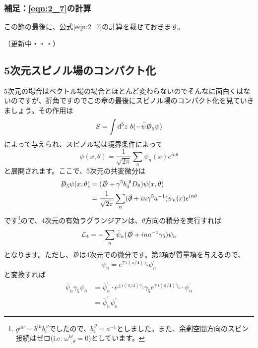 \documentclass[unicode,a4paper,11pt]{ltjsarticle}
\begin{document}
\subsubsection*{補足：\texorpdfstring{\eqref{eqn:2_7}}{公式}の計算}

この節の最後に、公式\eqref{eqn:2_7}の計算を載せておきます。

（更新中・・・）










\subsection{5次元スピノル場のコンパクト化}

5次元の場合はベクトル場の場合とほとんど変わらないのでそんなに面白くはないのですが、折角ですのでこの章の最後にスピノル場のコンパクト化を見ていきましょう。その作用は
\begin{equation}
   S
   =
   \int\dd^5 z\ b(-\bar{\psi}\slashed{D}_{5}\psi)
\end{equation}
によって与えられ、スピノル場は境界条件によって
\begin{equation}
   \psi(x,\theta)
   =
   \frac{1}{\sqrt{2\pi}}
   \sum_{n}\psi_{n}(x)e^{in\theta}
\end{equation}
と展開されます。ここで、5次元の共変微分は
\begin{align}
   \slashed{D}_{5}\psi(x,\theta)
    & =
   (\slashed{D}+\gamma^{5}b_{4}^{\ \theta}D_{\theta})\psi(x,\theta)
   \nonumber
   \\
    & =
   \frac{1}{\sqrt{2\pi}}\sum_{n}
   (\slashed{\partial}+in\gamma^{5}a^{-1})\psi_{n}(x)e^{in\theta}
\end{align}
です\footnote{
$g^{\mu\nu}=b^{i\mu}b_{i}^{\ \nu}$でしたので、$b_{4}^{\ \theta}=a^{-1}$としました。また、余剰空間方向のスピン接続はゼロ(i.e. $\omega^{kl}_{\ \ ,\theta}=0$)としています。
}ので、4次元の有効ラグランジアンは、$\theta$方向の積分を実行すれば
\begin{equation}
   \mathcal{L}_{4}
   =
   -
   \sum_{n}\bar{\psi}_{n}(\slashed{D}+ina^{-1}\gamma_{5})\psi_{n}
\end{equation}
となります。ただし、$\slashed{D}$は4次元での微分です。第2項が質量項を与えるので、
\begin{equation}
   \psi_n
   =
   e^{\mp i(\pi/4)\gamma_{5}}\psi_{n}^{\prime}
   \label{eqn:2_3}
\end{equation}
と変換すれば
\begin{align}
   \bar{\psi}_{n}\gamma_{5}\psi_{n}
    & =
   \bar{\psi}_{n}^{\prime}
   \cdot
   e^{\pm i(\pi/4)\gamma_{5}}\gamma_{5}e^{\mp i(\pi/4)\gamma_{5}}
   \cdot
   \psi_{n}^{\prime}
   \nonumber
   \\
    & =
   \bar{\psi}_{n}^{\prime}
   \psi_{n}^{\prime}
\end{align}
\end{document}
